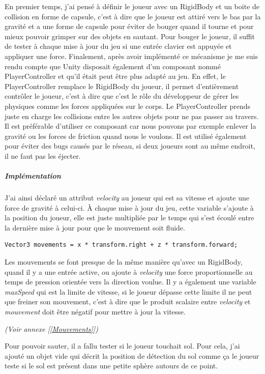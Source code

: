 \documentclass{article}
\begin{document}
En premier temps, j'ai pensé à définir le joueur avec un RigidBody et un boite de collision en forme de capsule, c'est à dire que le joueur est attiré vers le bas par la gravité et a une forme de capsule pour éviter de bouger quand il tourne et pour mieux pouvoir grimper sur des objets en sautant. Pour bouger le joueur, il suffit de tester à chaque mise à jour du jeu si une entrée clavier est appuyée et appliquer une force. Finalement, après avoir implémenté ce mécanisme je me suis rendu compte que Unity disposait également d'un composant nommé PlayerController et qu'il était peut être plus adapté au jeu. En effet, le PlayerController remplace le RigidBody du joueur, il permet d'entièrement contrôler le joueur, c'est à dire que c'est le rôle du développeur de gérer les physiques comme les forces appliquées sur le corps. Le PlayerController prends juste en charge les collisions entre les autres objets pour ne pas passer au travers. Il est préférable d'utiliser ce composant car nous pouvons par exemple enlever la gravité ou les forces de friction quand nous le voulons. Il est utilisé également pour éviter des bugs causés par le réseau, si deux joueurs sont au même endroit, il ne faut pas les éjecter.

\subparagraph{Implémentation}


J'ai ainsi déclaré un attribut \emph{velocity} au joueur qui est sa vitesse et ajoute une force de gravité à celui-ci. À chaque mise à jour du jeu, cette variable s'ajoute à la position du joueur, elle est juste multipliée par le temps qui s'est écoulé entre la dernière mise à jour pour que le mouvement soit fluide.

\begin{lstlisting}
Vector3 movements = x * transform.right + z * transform.forward;
\end{lstlisting}

Les mouvements se font presque de la même manière qu'avec un RigidBody, quand il y a une entrée active, ou ajoute à \emph{velocity} une force proportionnelle au temps de pression orientée vers la direction voulue. Il y a également une variable \emph{maxSpeed} qui est la limite de vitesse, si le joueur dépasse cette limite il ne peut que freiner son mouvement, c'est à dire que le produit scalaire entre \emph{velocity} et \emph{mouvement} doit être négatif pour mettre à jour la vitesse.

\emph{(Voir annexe [\ref{Mouvements}])}

Pour pouvoir sauter, il a fallu tester si le joueur touchait sol. Pour cela, j'ai ajouté un objet vide qui décrit la position de détection du sol comme ça le joueur teste si le sol est présent dans une petite sphère autours de ce point.
\end{document}
